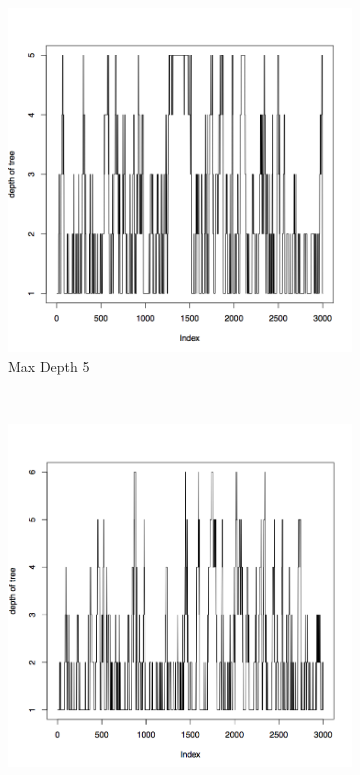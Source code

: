 \documentclass{article}
\begin{document}
\begin{figure}[H]
        \centering
        \begin{subfigure}[b]{0.3\textwidth}
                \centering
                \includegraphics[width=\textwidth]{depth_c5}
                \caption{Max Depth 5}
                \label{fig:gull}
        \end{subfigure}%
        ~ %
        \begin{subfigure}[b]{0.3\textwidth}
                \centering
                \includegraphics[width=\textwidth]{depth_c6}

\end{subfigure}
\end{figure}
\end{document}
